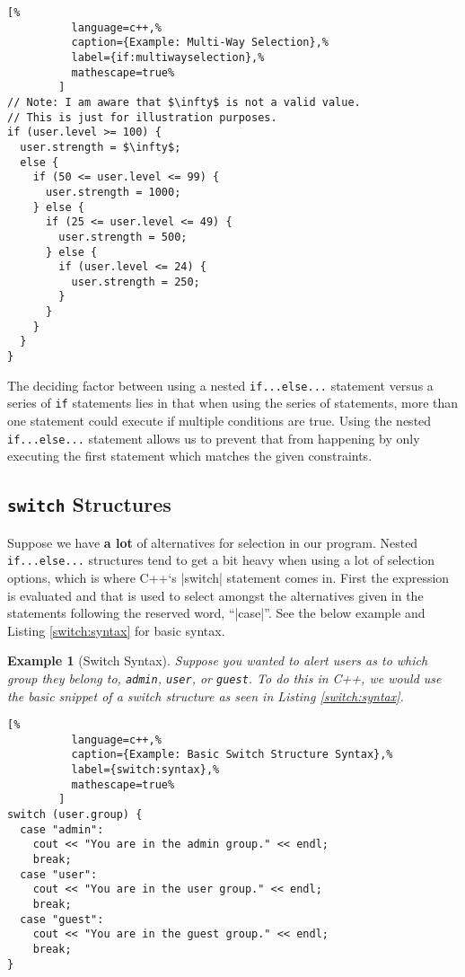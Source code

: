 \documentclass[12pt]{report}
\theoremstyle{definition}
\theoremstyle{plain}
\theoremstyle{plain}
\newtheorem*{examp*}{Example}
\begin{document}
        \begin{lstlisting}[%
          language=c++,%
          caption={Example: Multi-Way Selection},%
          label={if:multiwayselection},%
          mathescape=true%
        ]
// Note: I am aware that $\infty$ is not a valid value.
// This is just for illustration purposes.
if (user.level >= 100) {
  user.strength = $\infty$;
  else {
    if (50 <= user.level <= 99) {
      user.strength = 1000;
    } else {
      if (25 <= user.level <= 49) {
        user.strength = 500;
      } else {
        if (user.level <= 24) {
          user.strength = 250;
        }
      }
    }
  }
}
        \end{lstlisting}

        The deciding factor between using a nested \texttt{if...else...}
          statement versus a series of \texttt{if} statements lies in that when
          using the series of statements, more than one statement could execute
          if multiple conditions are true. Using the nested
          \texttt{if...else...} statement allows us to prevent that from
          happening by only executing the first statement which matches the
          given constraints.

      \newpage
      \subsection{\texttt{switch} Structures}
        Suppose we have \textbf{a lot} of alternatives for selection in our
          program. Nested \texttt{if...else...} structures tend to get a bit
          heavy when using a lot of selection options, which is where C++`s
          |switch| statement comes in. First the expression is evaluated and
          that is used to select amongst the alternatives given in the
          statements following the reserved word, ``|case|''. See the below
          example and Listing \ref{switch:syntax} for basic syntax.

        \begin{examp*}[Switch Syntax]
          Suppose you wanted to alert users as to which group they belong to,
            \texttt{admin}, \texttt{user}, or \texttt{guest}. To do this in C++,
            we would use the basic snippet of a switch structure as seen in
            Listing \ref{switch:syntax}.
        \end{examp*}

        \begin{lstlisting}[%
          language=c++,%
          caption={Example: Basic Switch Structure Syntax},%
          label={switch:syntax},%
          mathescape=true%
        ]
switch (user.group) {
  case "admin":
    cout << "You are in the admin group." << endl;
    break;
  case "user":
    cout << "You are in the user group." << endl;
    break;
  case "guest":
    cout << "You are in the guest group." << endl;
    break;
}
        \end{lstlisting}





  \newpage
  \printbibliography[
    heading=bibintoc,
    title={Bibliography}
  ]
\end{document}
